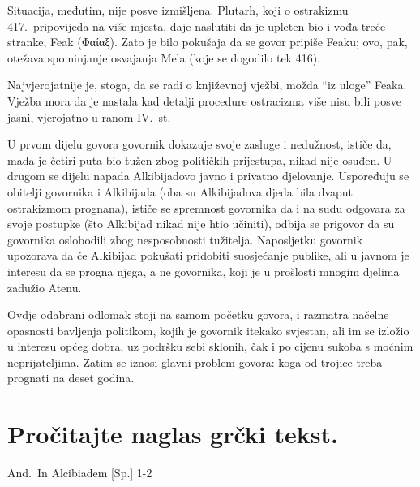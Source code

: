 Situacija, međutim, nije posve izmišljena. Plutarh, koji o ostrakizmu 417.\ pripovijeda na više mjesta, daje naslutiti da je upleten bio i vođa treće stranke, Feak (Φαίαξ). Zato je bilo pokušaja da se govor pripiše Feaku; ovo, pak, otežava spominjanje osvajanja Mela (koje se dogodilo tek 416). 

Najvjerojatnije je, stoga, da se radi o književnoj vježbi, možda ``iz uloge'' Feaka. Vježba mora da je nastala kad detalji procedure ostracizma više nisu bili posve jasni, vjerojatno u ranom IV.~st.

U prvom dijelu govora govornik dokazuje svoje zasluge i nedužnost, ističe da, mada je četiri puta bio tužen zbog političkih prijestupa, nikad nije osuđen. U drugom se dijelu napada Alkibijadovo javno i privatno djelovanje. Uspoređuju se obitelji govornika i Alkibijada (oba su Alkibijadova djeda bila dvaput ostrakizmom prognana), ističe se spremnost govornika da i na sudu odgovara za svoje postupke (što Alkibijad nikad nije htio učiniti), odbija se prigovor da su govornika oslobodili zbog nesposobnosti tužitelja. Naposljetku govornik upozorava da će Alkibijad pokušati pridobiti suosjećanje publike, ali u javnom je interesu da se progna njega, a ne govornika, koji je u prošlosti mnogim djelima zadužio Atenu.

Ovdje odabrani odlomak stoji na samom početku govora, i razmatra načelne opasnosti bavljenja politikom, kojih je govornik itekako svjestan, ali im se izložio u interesu općeg dobra, uz podršku sebi sklonih, čak i po cijenu sukoba s moćnim neprijateljima. Zatim se iznosi glavni problem govora: koga od trojice treba prognati na deset godina.

\newpage

\section*{Pročitajte naglas grčki tekst.}

And.\ In Alcibiadem [Sp.] 1-2


\medskip


